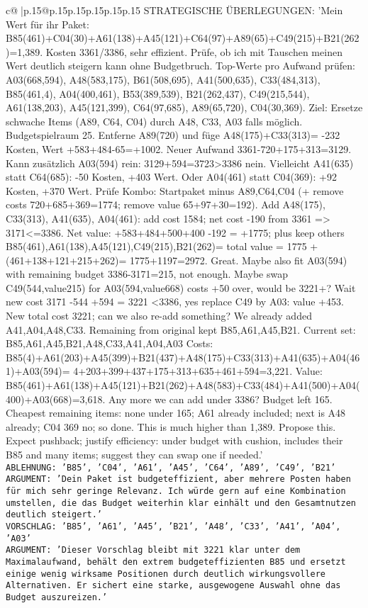 \documentclass{article}
\begin{document}
{\begin{supertabular}{c@{$\;$}|p{.15\linewidth}@{}p{.15\linewidth}p{.15\linewidth}p{.15\linewidth}p{.15\linewidth}p{.15\linewidth}}
{{{	 STRATEGISCHE ÜBERLEGUNGEN: {'Mein Wert für ihr Paket: B85(461)+C04(30)+A61(138)+A45(121)+C64(97)+A89(65)+C49(215)+B21(262)=1,389. Kosten 3361/3386, sehr effizient. Prüfe, ob ich mit Tauschen meinen Wert deutlich steigern kann ohne Budgetbruch. Top-Werte pro Aufwand prüfen: A03(668,594), A48(583,175), B61(508,695), A41(500,635), C33(484,313), B85(461,4), A04(400,461), B53(389,539), B21(262,437), C49(215,544), A61(138,203), A45(121,399), C64(97,685), A89(65,720), C04(30,369). Ziel: Ersetze schwache Items (A89, C64, C04) durch A48, C33, A03 falls möglich. Budgetspielraum 25. Entferne A89(720) und füge A48(175)+C33(313)= -232 Kosten, Wert +583+484-65=+1002. Neuer Aufwand 3361-720+175+313=3129. Kann zusätzlich A03(594) rein: 3129+594=3723>3386 nein. Vielleicht A41(635) statt C64(685): -50 Kosten, +403 Wert. Oder A04(461) statt C04(369): +92 Kosten, +370 Wert. Prüfe Kombo: Startpaket minus A89,C64,C04 (+ remove costs 720+685+369=1774; remove value 65+97+30=192). Add A48(175), C33(313), A41(635), A04(461): add cost 1584; net cost -190 from 3361 => 3171<=3386. Net value: +583+484+500+400 -192 = +1775; plus keep others B85(461),A61(138),A45(121),C49(215),B21(262)= total value = 1775 + (461+138+121+215+262)= 1775+1197=2972. Great. Maybe also fit A03(594) with remaining budget 3386-3171=215, not enough. Maybe swap C49(544,value215) for A03(594,value668) costs +50 over, would be 3221+? Wait new cost 3171 -544 +594 = 3221 <3386, yes replace C49 by A03: value +453. New total cost 3221; can we also re-add something? We already added A41,A04,A48,C33. Remaining from original kept B85,A61,A45,B21. Current set: {B85,A61,A45,B21,A48,C33,A41,A04,A03} Costs: B85(4)+A61(203)+A45(399)+B21(437)+A48(175)+C33(313)+A41(635)+A04(461)+A03(594)= 4+203+399+437+175+313+635+461+594=3,221. Value: B85(461)+A61(138)+A45(121)+B21(262)+A48(583)+C33(484)+A41(500)+A04(400)+A03(668)=3,618. Any more we can add under 3386? Budget left 165. Cheapest remaining items: none under 165; A61 already included; next is A48 already; C04 369 no; so done. This is much higher than 1,389. Propose this. Expect pushback; justify efficiency: under budget with cushion, includes their B85 and many items; suggest they can swap one if needed.'}\\ \tt ABLEHNUNG: {'B85', 'C04', 'A61', 'A45', 'C64', 'A89', 'C49', 'B21'}\\ \tt ARGUMENT: {'Dein Paket ist budgeteffizient, aber mehrere Posten haben für mich sehr geringe Relevanz. Ich würde gern auf eine Kombination umstellen, die das Budget weiterhin klar einhält und den Gesamtnutzen deutlich steigert.'}\\ \tt VORSCHLAG: {'B85', 'A61', 'A45', 'B21', 'A48', 'C33', 'A41', 'A04', 'A03'}\\ \tt ARGUMENT: {'Dieser Vorschlag bleibt mit 3221 klar unter dem Maximalaufwand, behält den extrem budgeteffizienten B85 und ersetzt einige wenig wirksame Positionen durch deutlich wirkungsvollere Alternativen. Er sichert eine starke, ausgewogene Auswahl ohne das Budget auszureizen.'} 
	  } 
	   } 
	   } 
	  \\ 
 


\end{supertabular}}
\end{document}
